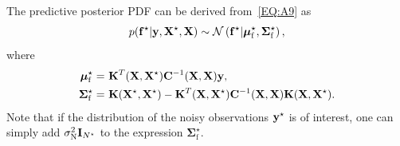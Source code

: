 \documentclass[preprint,3p]{elsarticle}
\begin{document}
\begin{linenumbers}
The predictive posterior PDF can be derived from~\cref{EQ:A9} as
\begin{equation}
p({\bf f}^\star|{\bf y},{\bf X}^\star,{\bf X})\sim\mathcal{N}\left({\bf f}^\star|\boldsymbol{\mu}_\text{f}^\star,\boldsymbol{\Sigma}_\text{f}^\star\right),
\label{EQ:A10}
\end{equation}
where 
\begin{equation}
	\begin{aligned}
		\boldsymbol{\mu}_\text{f}^\star=~&{\bf K}^T({\bf X},{\bf X}^\star){\bf C}^{-1}({\bf X},{\bf X}){\bf y},\\
		\boldsymbol{\Sigma}_\text{f}^\star=~&{\bf K}({\bf X}^\star,{\bf X}^\star)-{\bf K}^T({\bf X},{\bf X}^\star) {\bf C}^{-1}({\bf X},{\bf X}) {\bf K}({\bf X},{\bf X}^\star).
	\end{aligned}
	\label{EQ:A11}
\end{equation}
Note that if the distribution of the noisy observations ${\bf y}^\star$ is of interest, one can simply add $\sigma^2_\text{N}{\bf I}_{N^\star}$ to the expression $\boldsymbol{\Sigma}_\text{f}^\star$.

\end{linenumbers}
	
\clearpage

% 


\end{document}
